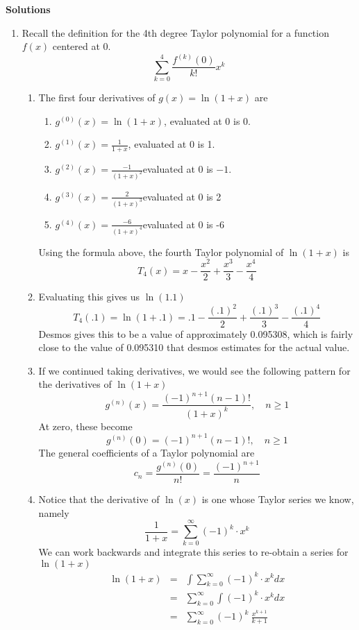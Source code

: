 \documentclass{article}
\begin{document}
       \begin{center}
        \textbf{\Large{Solutions}}
    \end{center}
    \begin{enumerate}
    \item Recall the definition for the 4th degree Taylor polynomial for a function $f(x)$ centered at 0.
    \[\sum_{k=0}^4 \frac{f^{(k)}(0)}{k!}x^k\]
    \begin{enumerate}
        \item The first four derivatives of $g(x)=\ln(1+x)$ are 
        \begin{enumerate}[itemsep = .5em]
            \item $g^{(0)}(x) = \ln(1+x)$, evaluated at 0 is 0.
            \item $g^{(1)}(x) = \frac{1}{1+x}$, evaluated at 0 is 1.
            \item $g^{(2)}(x) = \frac{-1}{(1+x)^2} $evaluated at 0 is $-1$.
            \item $g^{(3)}(x) = \frac{2}{(1+x)^3} $evaluated at 0 is 2
            \item $g^{(4)}(x) = \frac{-6}{(1+x)^4} $evaluated at 0 is -6
        \end{enumerate}
        Using the formula above, the fourth Taylor polynomial of $\ln(1+x)$ is
        \[T_4(x) = x-\frac{x^2}{2}+\frac{x^3}{3}-\frac{x^4}{4}\]
        \item Evaluating this gives us  $\ln(1.1)$
        \[T_4(.1) =\ln(1+.1) = .1-\frac{(.1)^2}{2}+\frac{(.1)^3}{3}-\frac{(.1)^4}{4}\]
        Desmos gives this to be a value of approximately 0.095308, which is fairly close to the value of 0.095310 that desmos estimates for the actual value.
        \item If we continued taking derivatives, we would see the following pattern for the derivatives of $\ln(1+x)$
        \[g^{(n)}(x) = \frac{(-1)^{n+1}(n-1)!}{(1+x)^k}, \quad n\ge 1\]
        At zero, these become
        \[g^{(n)}(0) = (-1)^{n+1}(n-1)!, \quad n\ge 1\]
        The general coefficients of a Taylor polynomial are
        \[c_n =\frac{g^{(n)}(0)}{n!} = \frac{(-1)^{n+1}}{n} \]
        \item Notice that the derivative of $\ln(x)$ is one whose Taylor series we know, namely
        \[\frac{1}{1+x} = \sum_{k=0}^\infty (-1)^k\cdot x^k\]
        We can work backwards and integrate this series to re-obtain a series for $\ln(1+x)$
        \begin{eqnarray*}
        \ln(1+x) &=& \int \sum_{k=0}^\infty (-1)^k\cdot x^k dx \\[1em]
        &=&  \sum_{k=0}^\infty \int(-1)^k\cdot x^k dx \\[1em]
        &=& \sum_{k=0}^\infty (-1)^k\ \frac{x^{k+1}}{k+1}  
        \end{eqnarray*}
        

\end{enumerate}
\end{enumerate}
\end{document}
